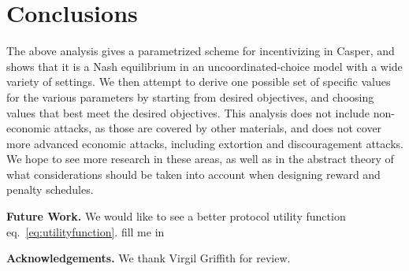 \documentclass[12pt, final]{article}
\newcommand*{\todo}[1]{\color{red} #1}
\newcommand{\eqref}[1]{eq.~\ref{#1}}
\begin{document}
\section{Conclusions}

The above analysis gives a parametrized scheme for incentivizing in Casper, and shows that it is a Nash equilibrium in an uncoordinated-choice model with a wide variety of settings. We then attempt to derive one possible set of specific values for the various parameters by starting from desired objectives, and choosing values that best meet the desired objectives. This analysis does not include non-economic attacks, as those are covered by other materials, and does not cover more advanced economic attacks, including extortion and discouragement attacks. We hope to see more research in these areas, as well as in the abstract theory of what considerations should be taken into account when designing reward and penalty schedules.


\textbf{Future Work.} We would like to see a better protocol utility function \eqref{eq:utilityfunction}.  \todo{fill me in}

\textbf{Acknowledgements.}  We thank Virgil Griffith for review.





\end{document}
